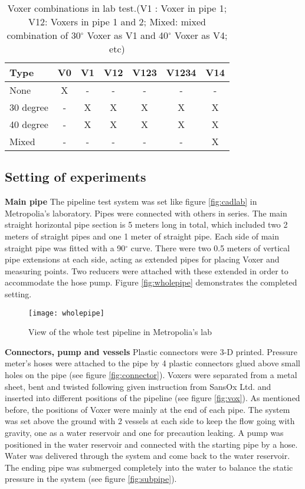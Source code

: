 \begin{table}[h]
  \centering
  \caption{Voxer combinations in lab test.\newline (V1 : Voxer in pipe 1; V12: Voxers in pipe 1 and 2; Mixed: mixed combination of 30$^{\circ}$ Voxer as  V1 and 40$^{\circ}$ Voxer as V4; etc)}
  \begin{tabular}{l*{6}{c}}
Type             & V0 & V1 & V12 & V123 & V1234 & V14 \\
\hline
None & X & - & - & - & - & -   \\
30 degree           & - & X & X & X &  X & X  \\
40 degree           & - & X & X & X &  X & X   \\
Mixed     & - & - & - & - & - & X   \\
\end{tabular}
  \label{table:combi}
\end{table}

\subsection{Setting of experiments}

\textbf{Main pipe} \newline
The pipeline test system was set like figure \vref{fig:cadlab} in Metropolia’s laboratory.  Pipes were connected with others in series. The main straight horizontal pipe section is 5 meters long in total, which included two 2 meters of straight pipes and one 1 meter of straight pipe. Each side of main straight pipe was fitted with a 90$^{\circ}$ curve. There were two 0.5 meters of vertical pipe extensions at each side, acting as extended pipes for placing Voxer and measuring points. Two reducers were attached with these extended in order to accommodate the hose pump. Figure \vref{fig:wholepipe} demonstrates the completed setting.

\begin{figure}[h]
  \centering
  \texttt{[image: wholepipe]}
  \caption{View of the whole test pipeline in Metropolia's lab }
  \label{fig:wholepipe}
\end{figure}

\textbf{Connectors, pump and vessels}\newline
Plastic connectors were 3-D printed. Pressure meter’s hoses were attached to the pipe by 4 plastic connectors glued above small holes on the pipe (see figure \vref{fig:connector}). Voxers were separated from a metal sheet, bent and twisted following given instruction from SansOx Ltd. and inserted into different positions of the pipeline (see figure \vref{fig:vox}). As mentioned before, the positions of Voxer were mainly at the end of each pipe. The system was set above the ground with 2 vessels at each side to keep the flow going with gravity, one as a water reservoir and one for precaution leaking. A pump was positioned in the water reservoir and connected with the starting pipe by a hose. Water was delivered through the system and come back to the water reservoir. The ending pipe was submerged completely into the water to balance the static pressure in the system (see figure \ref{fig:subpipe}).

